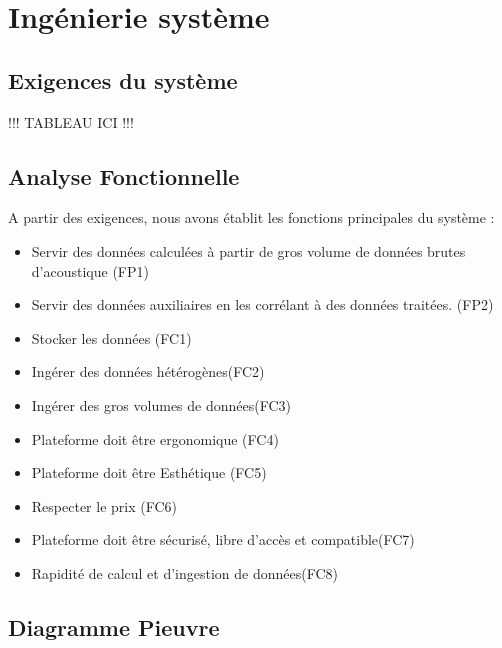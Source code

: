 \documentclass[a4paper]{article}
\begin{document}
\section{Ingénierie système}

\subsection{Exigences du système}

!!! TABLEAU ICI !!!



\subsection{Analyse Fonctionnelle}

A partir des exigences, nous avons établit les fonctions principales du système :

\begin{itemize}

	\item Servir des données calculées à partir de gros volume de données brutes
	      d’acoustique (FP1)

	\item Servir des données auxiliaires en les corrélant à des données traitées. (FP2)

	\item Stocker les données (FC1)

	\item Ingérer des données hétérogènes(FC2)

	\item Ingérer des gros volumes de données(FC3)

	\item Plateforme doit être ergonomique (FC4)

	\item Plateforme doit être Esthétique (FC5)

	\item Respecter le prix (FC6)

	\item Plateforme doit être sécurisé, libre d’accès et compatible(FC7)

	\item Rapidité de calcul et d’ingestion de données(FC8)

\end{itemize}

\newpage
\subsection{Diagramme Pieuvre}
\end{document}
